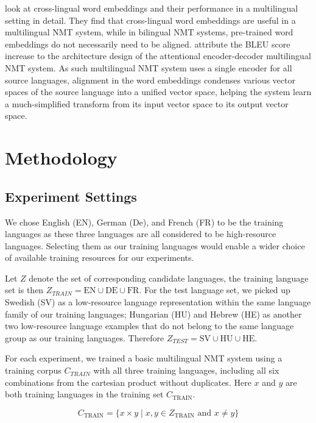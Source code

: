 \documentclass[thesis]{cluu}
\begin{document}
\textcite{Qi:2018aa} look at cross-lingual word embeddings and their performance in a multilingual setting in detail. They find that cross-lingual word embeddings are useful in a multilingual NMT system, while in bilingual NMT systems, pre-trained word embeddings do not necessarily need to be aligned. \textcite{Qi:2018aa} attribute the BLEU score increase to the architecture design of the attentional encoder-decoder multilingual NMT system. As such multilingual NMT system uses a single encoder for all source languages, alignment in the word embeddings condenses various vector spaces of the source language into a unified vector space, helping the system learn a much-simplified transform from its input vector space to its output vector space.

\chapter{Methodology}
\label{chap:method}

\section{Experiment Settings}
\label{sec:initial_exp_settings}

We chose English (EN), German (De), and French (FR) to be the training languages as these three languages are all considered to be high-resource languages. Selecting them as our training languages would enable a wider choice of available training resources for our experiments.

Let $Z$ denote the set of corresponding candidate languages, the training language set is then $Z_{TRAIN} = {\text{EN}\cup \text{DE}\cup \text{FR}}$. For the test language set, we picked up Swedish (SV) as a low-resource language representation within the same language family of our training languages; Hungarian (HU) and Hebrew (HE) as another two low-resource language examples that do not belong to the same language group as our training languages. Therefore $Z_{TEST} = {\text{SV}\cup \text{HU}\cup \text{HE}}$.

For each experiment, we trained a basic multilingual NMT system using a training corpus $C_{TRAIN}$ with all three training languages, including all six combinations from the cartesian product without duplicates. Here $x$ and $y$ are both training languages in the training set $C_{\text{TRAIN}}$.

\begin{equation*}
  C_{\text{TRAIN}} = \{x \times y \mid x, y \in Z_{\text{TRAIN}} \text{ and } x \neq y\}
\end{equation*}
\end{document}
